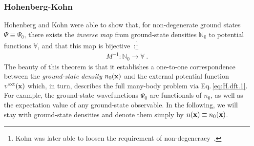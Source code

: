 \subsubsection{Hohenberg-Kohn}
Hohenberg and Kohn were able to show that, for non-degenerate ground states $\Psi \equiv \Psi_0$, there exists the \emph{inverse map} from ground-state densities $\mathbb N_0$ to potential functions $\mathbb V$, and that this map is bijective~:\footnote{Kohn was later able to loosen the requirement of non-degeneracy~.}
\begin{align}
	M^{-1}: \mathbb N_0 \rightarrow \mathbb V~. 
\end{align}
The beauty of this theorem is that it establishes a one-to-one correspondence between the \emph{ground-state density} $n_0 ({\bf x})$ and the external potential function $v^{\rm ext} ({\bf x})$ which, in turn, describes the full many-body problem via Eq.\,\eqref{eq:H.dft.1}. For example, the ground-state wavefunctions $\Psi_0$ are functionals of $n_0$, as well as the expectation value of any ground-state observable. In the following, we will stay with ground-state densities and denote them simply by $n ({\bf x}) \equiv n_0 ({\bf x})$.

